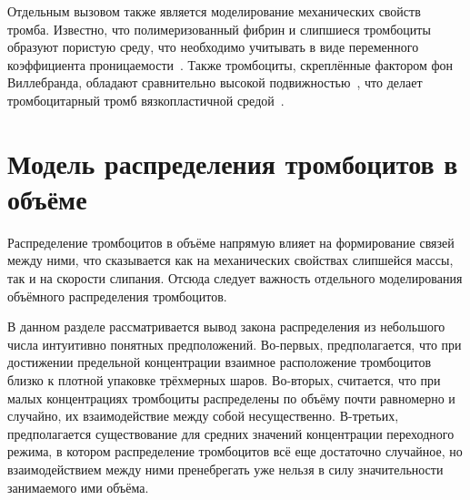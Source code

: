 Отдельным вызовом также является моделирование механических свойств тромба.
Известно, что полимеризованный фибрин и слипшиеся тромбоциты образуют пористую среду,
что необходимо учитывать в виде переменного коэффициента проницаемости~\cite{wufsus2013clot_permeability}.
Также тромбоциты, скреплённые фактором фон Виллебранда, обладают сравнительно высокой подвижностью~\cite{savage1996platelet_adhesion},
что делает тромбоцитарный тромб вязкопластичной средой~\cite{jamiolkowski2016visualization}.


% 


\section{Модель распределения тромбоцитов в объёме}
\label{section:volume_distribution_models}

Распределение тромбоцитов в объёме напрямую влияет на формирование связей между ними,
что сказывается как на механических свойствах слипшейся массы, так и на скорости слипания.
Отсюда следует важность отдельного моделирования объёмного распределения тромбоцитов.

В данном разделе рассматривается вывод закона распределения из небольшого числа интуитивно понятных предположений.
Во-первых, предполагается, что при достижении предельной концентрации взаимное расположение тромбоцитов
близко к плотной упаковке трёхмерных шаров.
Во-вторых, считается, что при малых концентрациях тромбоциты распределены по объёму почти равномерно и случайно,
их взаимодействие между собой несущественно.
В-третьих, предполагается существование для средних значений концентрации переходного режима,
в котором распределение тромбоцитов всё еще достаточно случайное,
но взаимодействием между ними пренебрегать уже нельзя в силу значительности занимаемого ими объёма.


